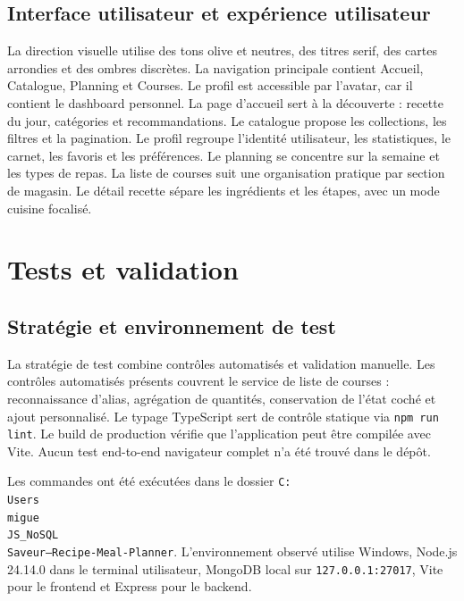 \documentclass[12pt,a4paper]{report}
\begin{document}
\section{Interface utilisateur et expérience utilisateur}
La direction visuelle utilise des tons olive et neutres, des titres serif, des cartes arrondies et des ombres discrètes. La navigation principale contient Accueil, Catalogue, Planning et Courses. Le profil est accessible par l'avatar, car il contient le dashboard personnel. La page d'accueil sert à la découverte : recette du jour, catégories et recommandations. Le catalogue propose les collections, les filtres et la pagination. Le profil regroupe l'identité utilisateur, les statistiques, le carnet, les favoris et les préférences. Le planning se concentre sur la semaine et les types de repas. La liste de courses suit une organisation pratique par section de magasin. Le détail recette sépare les ingrédients et les étapes, avec un mode cuisine focalisé.

\chapter{Tests et validation}
\section{Stratégie et environnement de test}
La stratégie de test combine contrôles automatisés et validation manuelle. Les contrôles automatisés présents couvrent le service de liste de courses : reconnaissance d'alias, agrégation de quantités, conservation de l'état coché et ajout personnalisé. Le typage TypeScript sert de contrôle statique via \texttt{npm run lint}. Le build de production vérifie que l'application peut être compilée avec Vite. Aucun test end-to-end navigateur complet n'a été trouvé dans le dépôt.

Les commandes ont été exécutées dans le dossier \texttt{C:\\Users\\migue\\JS\_NoSQL\\Saveur---Recipe-Meal-Planner}. L'environnement observé utilise Windows, Node.js 24.14.0 dans le terminal utilisateur, MongoDB local sur \texttt{127.0.0.1:27017}, Vite pour le frontend et Express pour le backend.
\end{document}
